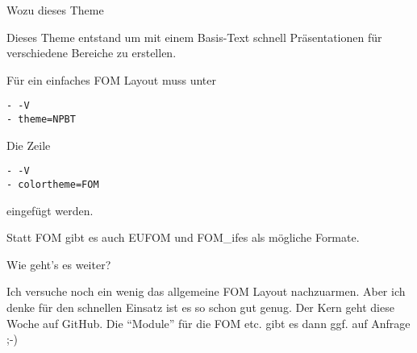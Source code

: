 \documentclass[10pt,ngerman,a4paper,ignorenonframetext,]{beamer}
\begin{document}
\begin{frame}[fragile]{Wozu dieses Theme}
\protect\hypertarget{wozu-dieses-theme-1}{}

Dieses Theme entstand um mit einem Basis-Text schnell Präsentationen für
verschiedene Bereiche zu erstellen.

Für ein einfaches FOM Layout muss unter

\begin{verbatim}
- -V
- theme=NPBT
\end{verbatim}

Die Zeile

\begin{verbatim}
- -V
- colortheme=FOM
\end{verbatim}

eingefügt werden.

Statt FOM gibt es auch EUFOM und FOM\_ifes als mögliche Formate.

\end{frame}

\begin{frame}{Wie geht's es weiter?}
\protect\hypertarget{wie-gehts-es-weiter-1}{}

Ich versuche noch ein wenig das allgemeine FOM Layout nachzuarmen. Aber
ich denke für den schnellen Einsatz ist es so schon gut genug. Der Kern
geht diese Woche auf GitHub. Die ``Module'' für die FOM etc. gibt es
dann ggf. auf Anfrage ;-)

\end{frame}
\end{document}
